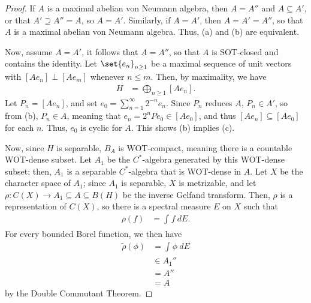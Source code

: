 \documentclass[10pt]{mypackage}
\begin{document}
\begin{proof}
  If $A$ is a maximal abelian von Neumann algebra, then $A = A''$ and $A\subseteq A'$, or that $A'\supseteq A'' = A$, so $A = A'$. Similarly, if $A = A'$, then $A = A' = A''$, so that $A$ is a maximal abelian von Neumann algebra. Thus, (a) and (b) are equivalent.

  Now, assume $A = A'$, it follows that $A = A''$, so that $A$ is SOT-closed and contains the identity. Let $\set{e_n}_{n\geq 1}$ be a maximal sequence of unit vectors with $ \left[ Ae_n \right]\perp \left[ A e_m \right] $ whenever $n\leq m$. Then, by maximality, we have
  \begin{align*}
    H &= \bigoplus_{n\geq 1} \left[ Ae_n \right].
  \end{align*}
  Let $P_n = \left[ Ae_n \right]$, and set $e_0 = \sum_{n=1}^{\infty}2^{-n}e_n$. Since $P_n$ reduces $A$, $P_n \in A'$, so from (b), $P_n\in A$, meaning that $e_n = 2^{n}Pe_0\in \left[ Ae_0 \right]$, and thus $\left[ Ae_n \right]\subseteq \left[ Ae_0 \right]$ for each $n$. Thus, $e_0$ is cyclic for $A$. This shows (b) implies (c).

  Now, since $H$ is separable, $B_A$ is WOT-compact, meaning there is a countable WOT-dense subset. Let $A_1$ be the $C^{\ast}$-algebra generated by this WOT-dense subset; then, $A_1$ is a separable $C^{\ast}$-algebra that is WOT-dense in $A$. Let $X$ be the character space of $A_1$; since $A_1$ is separable, $X$ is metrizable, and let $\rho\colon C(X)\rightarrow A_1\subseteq A\subseteq B(H)$ be the inverse Gelfand transform. Then, $\rho$ is a representation of $C(X)$, so there is a spectral measure $E$ on $X$ such that
  \begin{align*}
    \rho(f) &= \int_{}^{} f\:dE.
  \end{align*}
  For every bounded Borel function, we then have
  \begin{align*}
    \widetilde{\rho}\left( \phi \right) &= \int_{}^{} \phi\:dE\\
                                        &\in A_1''\\
                                        &= A''\\
                                        &= A
  \end{align*}
  by the Double Commutant Theorem.


\end{proof}
\end{document}

